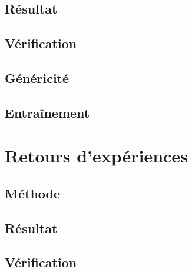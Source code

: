 \subsection{Résultat}\label{tests:informatique:resultat}

\subsection{Vérification}\label{tests:informatique:verification}

\subsection{Généricité}\label{tests:informatique:genericite}

\subsection{Entraînement}\label{tests:informatique:entrainement}

\section{Retours d'expériences}\label{tests:retours}

\subsection{Méthode}\label{tests:retours:methode}

\subsection{Résultat}\label{tests:retours:resultat}

\subsection{Vérification}\label{tests:retours:verification}

